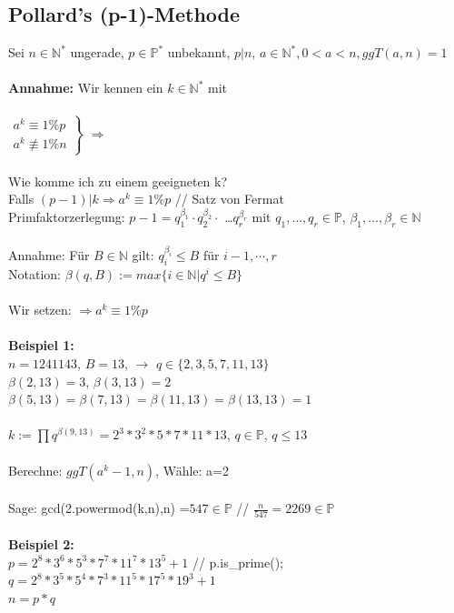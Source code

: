 \documentclass[10pt]{article}
\newcommand{\NN}{\mathbb{N}} %
\newcommand{\PN}{\mathbb{P}} %
\newcommand{\ra}{\rightarrow}
\newcommand{\Ra}{\Rightarrow}
\newcommand{\Brackar}[2]{\left.\begin{array}{#1} #2 \end{array}\right\rbrace} %
\begin{document}
\subsection{Pollard's (p-1)-Methode}
Sei $n \in \NN^*$ ungerade, $p \in \PN^*$ unbekannt, $p|n$, $a \in \NN^*, 0< a < n, ggT(a,n)=1$ \\
\\
\textbf{Annahme:}
Wir kennen ein $k\in \NN^*$ mit \\ \\
$\Brackar{l}{a^k \equiv 1 \% p \\ a^k \not\equiv 1 \% n} $ $\Ra$  \\
\\
Wie komme ich zu einem geeigneten k? \\
Falls $(p-1)|k \Ra a^k \equiv 1 \% p$ // Satz von Fermat \\
Primfaktorzerlegung:  $p-1 = q_1^{\beta_1} \cdot q_2^{\beta_2} \cdot$ \dots $q_r^{\beta_r}$ 
mit $q_1, \dots, q_r \in \PN$, 
$\beta_1, \dots, \beta_r \in \NN$ \\
\\
Annahme: Für $B \in \NN$ gilt: $q_i^{\beta_i} \leq B$ für $i-1, \cdots, r$ \\
Notation: $\beta(q,B):=max\{i\in\NN | q^i \leq B\}$ \\
\\
Wir setzen: \fbox{$k:=\prod q^{\beta(q,B)}$\\$q\in \PN$\\$q \leq B$} $\Ra a^k \equiv 1 \% p$ \\
\\
\textbf{Beispiel 1:} \\
$n=1241143$, $B=13$, $\ra$ $q \in \{2,3,5,7,11,13\}$ \\
$\beta(2,13)=3$, $\beta(3,13)=2$ \\
$\beta(5,13)=\beta(7,13)=\beta(11,13)=\beta(13,13)=1$ \\
\\
$k:= \prod q^{\beta(9,13)}=2^3*3^2*5*7*11*13$, $q\in\PN$, $q\leq 13$ \\
\\
Berechne: $ggT(a^k-1,n)$, Wähle: a=2 \\
\\
Sage: gcd(2.powermod(k,n),n) =$547 \in \PN$ // $\frac{n}{547} = 2269 \in \PN$ \\
\\
\textbf{Beispiel 2:} \\
$p=2^8*3^6*5^3*7^7*11^7*13^5+1$ // p.is\_prime(); \\
$q=2^8*3^5*5^4*7^3*11^5*17^5*19^3+1$ \\
$n=p*q$ \\
\end{document}
